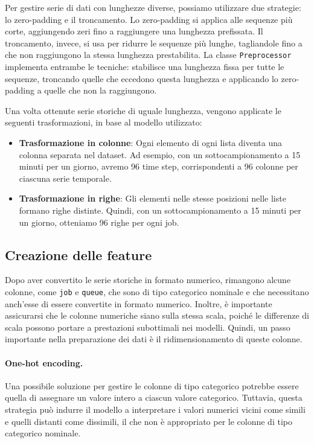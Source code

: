Per gestire serie di dati con lunghezze diverse, possiamo utilizzare due
strategie: lo zero-padding e il troncamento. Lo zero-padding si applica alle
sequenze più corte, aggiungendo zeri fino a raggiungere una lunghezza
prefissata. Il troncamento, invece, si usa per ridurre le sequenze più lunghe,
tagliandole fino a che non raggiungono la stessa lunghezza prestabilita. La
classe \texttt{Preprocessor} implementa entrambe le tecniche: stabilisce una
lunghezza fissa per tutte le sequenze, troncando quelle che eccedono questa
lunghezza e applicando lo zero-padding a quelle che non la raggiungono.

Una volta ottenute serie storiche di uguale lunghezza, vengono applicate le
seguenti trasformazioni, in base al modello utilizzato:

\begin{itemize}
    \item \textbf{Trasformazione in colonne}: Ogni elemento di ogni lista diventa una colonna
        separata nel dataset. Ad esempio, con un sottocampionamento a 15
        minuti per un giorno, avremo 96 time step, corrispondenti a 96 colonne
        per ciascuna serie temporale.
    \item \textbf{Trasformazione in righe}: 
        Gli elementi nelle stesse posizioni nelle liste formano righe
        distinte. Quindi, con un sottocampionamento a 15 minuti per un giorno,
        otteniamo 96 righe per ogni job.
\end{itemize}

\subsection{Creazione delle feature}

Dopo aver convertito le serie storiche in formato numerico, rimangono alcune
colonne, come \texttt{job} e \texttt{queue}, che sono di tipo categorico
nominale e che necessitano anch'esse di essere convertite in formato numerico.
Inoltre, è importante assicurarsi che le colonne numeriche siano sulla stessa
scala, poiché le differenze di scala possono portare a prestazioni subottimali
nei modelli. Quindi, un passo importante nella preparazione dei dati è il
ridimensionamento di queste colonne.

\paragraph{One-hot encoding.} 
\label{par:features}

Una possibile soluzione per gestire le colonne di tipo categorico potrebbe
essere quella di assegnare un valore intero a ciascun valore categorico.
Tuttavia, questa strategia può indurre il modello a interpretare i valori
numerici vicini come simili e quelli distanti come dissimili, il che non è
appropriato per le colonne di tipo categorico nominale.


